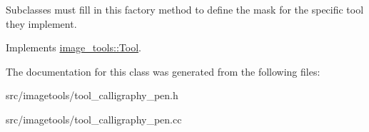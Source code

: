 Subclasses must fill in this factory method to define the mask for the specific tool they implement. 

Implements \hyperlink{classimage__tools_1_1Tool_a7d58325846dbc0467e52221daa1310a7}{image\+\_\+tools\+::\+Tool}.



The documentation for this class was generated from the following files\+:\begin{DoxyCompactItemize}
\item 
src/imagetools/tool\+\_\+calligraphy\+\_\+pen.\+h\item 
src/imagetools/tool\+\_\+calligraphy\+\_\+pen.\+cc\end{DoxyCompactItemize}
